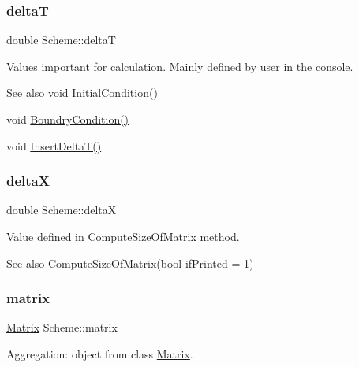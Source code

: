 \subsubsection{\texorpdfstring{deltaT}{deltaT}}
{\footnotesize\ttfamily double Scheme\+::deltaT\hspace{0.3cm}{\ttfamily [protected]}}

Values important for calculation. Mainly defined by user in the console. \begin{DoxySeeAlso}{See also}
void \mbox{\hyperlink{class_scheme_ad3546cda995629a2792629a072760ad2}{Initial\+Condition()}} 

void \mbox{\hyperlink{class_scheme_a36885039937c25f13c8daea654e37b97}{Boundry\+Condition()}} 

void \mbox{\hyperlink{class_scheme_ac5803e4951dc125b274f543d5037c21d}{Insert\+Delta\+T()}} 
\end{DoxySeeAlso}
\mbox{\label{class_scheme_a7491f0ce42370ab44134bf82bd0079a7}} 
\subsubsection{\texorpdfstring{deltaX}{deltaX}}
{\footnotesize\ttfamily double Scheme\+::deltaX\hspace{0.3cm}{\ttfamily [protected]}}

Value defined in Compute\+Size\+Of\+Matrix method. \begin{DoxySeeAlso}{See also}
\mbox{\hyperlink{class_scheme_a0364e328d78e84be15d293a66d946008}{Compute\+Size\+Of\+Matrix}}(bool if\+Printed = 1) 
\end{DoxySeeAlso}
\mbox{\label{class_scheme_a0e1fb8cb7e062d3f49715445a884f0e8}} 
\subsubsection{\texorpdfstring{matrix}{matrix}}
{\footnotesize\ttfamily \mbox{\hyperlink{class_matrix}{Matrix}} Scheme\+::matrix\hspace{0.3cm}{\ttfamily [protected]}}

Aggregation\+: object from class \mbox{\hyperlink{class_matrix}{Matrix}}. \mbox{\label{class_scheme_a1a21e7fac3843f2d64c49597c668ce56}} 
